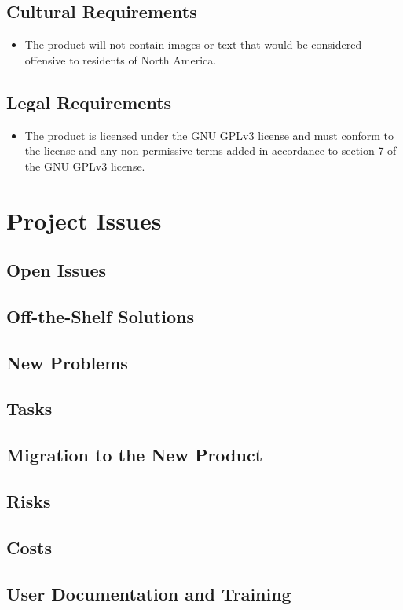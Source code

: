 \documentclass{article}
\begin{document}
		\subsection{Cultural Requirements}
		\begin{itemize}
			\itemsep0em
			\item The product will not contain images or text that would be 
			considered offensive to residents of North America.
		\end{itemize}
		\subsection{Legal Requirements}
		\begin{itemize}
			\itemsep0em
			\item The product is licensed under the GNU GPLv3 license and must 
			conform to the license and any non-permissive terms added in 
			accordance to section 7 of the GNU GPLv3 license.
		\end{itemize}
		
	\section{Project Issues}
		\subsection{Open Issues}
		\subsection{Off-the-Shelf Solutions}
		\subsection{New Problems}
		\subsection{Tasks}
		\subsection{Migration to the New Product}
		\subsection{Risks}
		\subsection{Costs}
		\subsection{User Documentation and Training}
\end{document}
